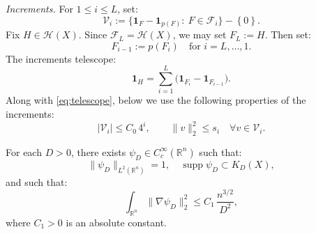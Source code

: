 \documentclass[12pt,reqno]{amsart}
\numberwithin{equation}{section}
\newcommand{\one}{\mathbf{1}}
\def \R {\mathbb{R}}
\begin{document}
\emph{Increments.} For \(1\le i\le L\), set:
\[
\mathcal V_i:=\bigl\{\one_F-\one_{p(F)}:\ F\in\mathcal F_i\bigr\} - \left\{0\right\}.
\]
Fix \(H\in\mathcal H(X)\). Since \(\mathcal F_L=\mathcal H(X)\), we may set \(F_L:=H\). Then set:
\[
F_{i-1}:=p(F_i)\quad 
\text{for \(i = L, \ldots, 1\).}
\]
The increments telescope:
\begin{equation}\label{eq:telescope}
\one_H=\sum_{i=1}^L\bigl(\one_{F_i}-\one_{F_{i-1}}\bigr).
\end{equation}
Along with \eqref{eq:telescope}, below we use the following properties of the increments:
\begin{equation}\label{eq:increments}
|\mathcal V_i|\le C_0\,4^i,\qquad
\|v\|_2^2\le s_i\quad \forall v\in\mathcal V_i.
\end{equation}
\begin{proposition}\label{prop:halfplanes}
For each \(D > 0\), there 
exists \(\psi_D\in C_c^\infty(\R^n)\) such that:
\[
\|\psi_D\|_{L^2(\R^n)}=1,\quad
\operatorname{supp}\psi_D\subset K_{D}(X),
\]
and such that:
\begin{equation}\label{eq:halfplane-energy}
\int_{\R^n}\|\nabla\psi_D\|_2^2\le C_1\,\frac{n^{3/2}}{D^2},
\end{equation}
where \(C_1 > 0\) is an absolute constant.
\end{proposition}
\end{document}
